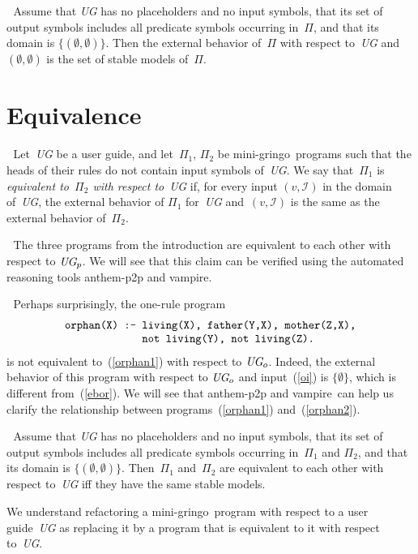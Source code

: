 \documentclass{article}
\def\beq{\begin{equation}}
\def\eeq#1{\label{#1}\end{equation}}
\def\ba{\begin{array}}
\def\ea{\end{array}}
\def\gringo{{\sc gringo}}
\def\vampire{{\sc vampire}}
\newcommand{\I}{\mathcal{I}}
\begin{document}
\medskip{}$\;$
Assume that \emph{UG} has no placeholders and no input symbols,
that its set of output symbols includes all predicate symbols occurring
in~$\Pi$, and that its domain is $\{(\emptyset,\emptyset)\}$.  Then
the external
behavior of~$\Pi$ with respect to~\emph{UG} and $(\emptyset,\emptyset)$
is the set of stable models of~$\Pi$.

\section{Equivalence}

$\;$
Let~\emph{UG} be a user guide, and let~$\Pi_1$, $\Pi_2$ be mini-\gringo\
programs such that the heads of their rules do not contain input symbols
of~\emph{UG}.  We say that~$\Pi_1$ is \emph{equivalent to~$\Pi_2$ with
respect to}~\emph{UG} if, for every input $(v,\I)$ in the domain of~\emph{UG},
the external behavior of $\Pi_1$ for~\emph{UG} and~$(v,\I)$ is the
same as the external behavior of~$\Pi_2$.

\medskip{}$\;$ The three programs from the
introduction are equivalent to each other with respect to $\emph{UG}_p$.
We will see that this claim can be verified using the automated reasoning
tools {\sc anthem-p2p} and \vampire.

\medskip{}$\;$ Perhaps surprisingly,
the one-rule program
\beq\ba l
\verb|orphan(X) :- living(X), father(Y,X), mother(Z,X),|\\
\verb|             not living(Y), not living(Z).|
\ea\eeq{orphan2}
is not equivalent to~(\ref{orphan1}) with respect to $\emph{UG}_o$.
Indeed, the external behavior of this program with respect
to $\emph{UG}_o$ and input~(\ref{oi}) is $\{\emptyset\}$, which
is different from~(\ref{ebor}).  We will see
that {\sc anthem-p2p} and \vampire\
can help us clarify the relationship between
programs~(\ref{orphan1}) and~(\ref{orphan2}).

\medskip{}$\;$
Assume that \emph{UG} has no placeholders and no input symbols,
that its set of output symbols includes all predicate symbols occurring
in~$\Pi_1$ and $\Pi_2$, and that its domain is $\{(\emptyset,\emptyset)\}$.
Then~$\Pi_1$ and~$\Pi_2$ are equivalent to each other with
respect to~\emph{UG} iff they have the same stable models.

\medskip
We understand refactoring a mini-\gringo\ program with respect to a
  user guide~\emph{UG} as replacing it by a program that is equivalent
  to it with respect to~\emph{UG}.
\end{document}
